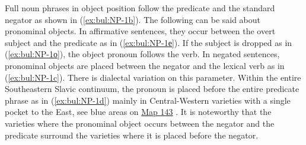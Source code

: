 \documentclass[output=paper,colorlinks=true, citecolor=brown]{langscibook}
\begin{document}
Full noun phrases in object position follow the predicate and the standard negator as shown in (\ref{ex:bul:NP-1b}). 
The following can be said about pronominal objects. In affirmative sentences, they occur between the overt subject and the predicate as in (\ref{ex:bul:NP-1е}). If the subject is dropped as in (\ref{ex:bul:NP-1о}), the object pronoun follows the verb. In negated sentences, pronominal objects are placed between the negator and the lexical verb as in (\ref{ex:bul:NP-1c}). There is dialectal variation on this parameter. Within the entire Southeastern Slavic continuum, the pronoun is placed before the entire predicate phrase as in (\ref{ex:bul:NP-1d}) mainly in Central-Western varieties with a single pocket to the East, see blue areas on \href{https://ibl.bas.bg/lib/bda4/#page/169/mode/1up}{Map 143} \citep{AntonovaEtAl2016}. It is noteworthy that the varieties where the pronominal object occurs between the negator and the predicate surround the varieties where it is placed before the negator.
\end{document}
